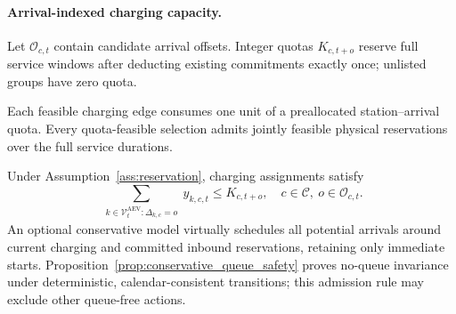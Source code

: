 \paragraph{Arrival-indexed charging capacity.}
Let $\mathcal O_{c,t}$ contain candidate arrival offsets. Integer quotas
$K_{c,t+o}$ reserve full service windows after deducting existing
commitments exactly once; unlisted groups have zero quota.

\begin{assumption}
\label{ass:reservation}
Each feasible charging edge consumes one unit of a preallocated
station--arrival quota. Every quota-feasible selection admits jointly
feasible physical reservations over the full service durations.
\end{assumption}

Under Assumption~\ref{ass:reservation}, charging assignments satisfy
\begin{equation}
\sum_{\substack{k\in\mathcal V_t^{\mathrm{AEV}}:\Delta_{k,c}=o}}
 y_{k,c,t}\le K_{c,t+o},
\quad c\in\mathcal C,\ o\in\mathcal O_{c,t}.
\label{eq:station-cap}
\end{equation}
An optional conservative model virtually schedules all potential
arrivals around current charging and committed inbound reservations,
retaining only immediate starts. Proposition~\ref{prop:conservative_queue_safety}
proves no-queue invariance under deterministic, calendar-consistent
transitions; this admission rule may exclude other queue-free actions.

